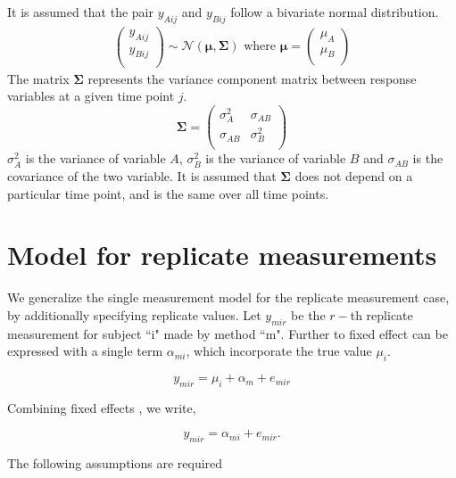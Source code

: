 \documentclass[12pt, a4paper]{report}
\theoremstyle{plain}
\theoremstyle{definition}
\theoremstyle{remark}
\begin{document}
	It is assumed that the pair $y_{Aij}$ and $y_{Bij}$ follow a bivariate normal distribution.
	\begin{eqnarray}
	\left(
	\begin{array}{c}
	y_{Aij} \\
	y_{Bij} \\
	\end{array}
	\right) \sim \mathcal{N}(
	\boldsymbol{\mu}, \boldsymbol{\Sigma})\mbox{   where } \boldsymbol{\mu} = \left(
	\begin{array}{c}
	\mu_{A} \\
	\mu_{B} \\
	\end{array}
	\right)
	\end{eqnarray}
	The matrix $\boldsymbol{\Sigma}$ represents the variance component matrix between response variables at a given time point $j$.
	\begin{equation}
	\boldsymbol{\Sigma} = \left( \begin{array}{cc}
	\sigma^2_{A} & \sigma_{AB} \\
	\sigma_{AB} & \sigma^2_{B}\\
	\end{array}\right)
	\end{equation}
	$\sigma^2_{A}$ is the variance of variable $A$, $\sigma^2_{B}$ is the variance of variable $B$ and $\sigma_{AB}$ is the covariance of the two variable. It is assumed that $\boldsymbol{\Sigma}$ does not depend on a particular time point, and is the same over all time points.
	
	

	\section{Model for replicate measurements}
	
	We generalize the single measurement model for the replicate measurement case, by additionally specifying replicate values. Let $y_{mir}$ be the $r-$th replicate measurement for subject ``i" made by method ``m". Further to \citet{barnhart} fixed effect can be expressed with a single term $\alpha_{mi}$, which incorporate the true value $\mu_i$.
	
	\[ y_{mir} = \mu_{i} + \alpha_{m} + e_{mir}  \]
	
	Combining fixed effects \citep{barnhart}, we write,
	
	\[ y_{mir} = \alpha_{mi} + e_{mir}.\]
	
	The following assumptions are required
	
\end{document}
